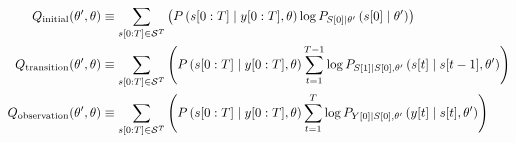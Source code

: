 \begin{align}
  \label{eq:Qinitial}
  Q_{\text{initial}} (\parameters',\parameters) &\equiv
%
  \sum_{\ts{s}{0}{T}\in\states^T} \left( P
  \left(\ts{s}{0}{T}\given \ts{y}{0}{T},\parameters \right) \log P_{\ti{S}{0}\given \parameters'}
  \left(\ti{s}{0}\given \parameters' \right) \right)\\
%
  \label{eq:Qtransition}
  Q_{\text{transition}} (\parameters',\parameters) &\equiv
%
  \sum_{\ts{s}{0}{T}\in\states^T} \left( P
  \left(\ts{s}{0}{T}\given \ts{y}{0}{T},\parameters \right) \sum_{t=1}^{T-1} \log
  P_{\ti{S}{1}\given \ti{S}{0},\parameters'}
  \left(\ti{s}{t}\given \ti{s}{t-1},\parameters' \right) \right) \\
%
  \label{eq:Qoutput}
  Q_{\text{observation}} (\parameters',\parameters) &\equiv
%
  \sum_{\ts{s}{0}{T}\in\states^T} \left( P
  \left(\ts{s}{0}{T}\given \ts{y}{0}{T},\parameters \right) \sum_{t=1}^T \log
  P_{\ti{Y}{0}\given \ti{S}{0},\parameters'}
  \left(\ti{y}{t}\given \ti{s}{t},\parameters' \right) \right)
%
\end{align}

